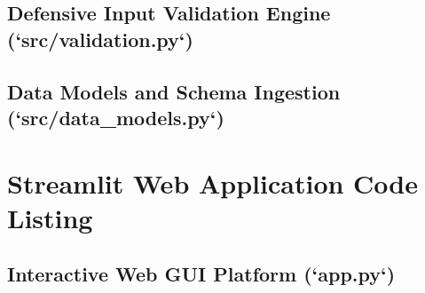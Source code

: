 \documentclass[12pt,a4paper,oneside]{report}
\begin{document}
\section{Defensive Input Validation Engine (`src/validation.py`)}


\section{Data Models and Schema Ingestion (`src/data\_models.py`)}


\chapter{Streamlit Web Application Code Listing}

\section{Interactive Web GUI Platform (`app.py`)}

\end{document}
